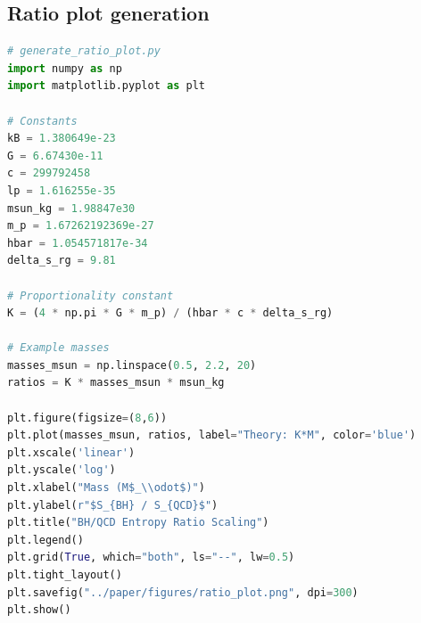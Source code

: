 \documentclass[aps,prd,onecolumn,nofootinbib,superscriptaddress]{revtex4-2}
\begin{document}
\subsection{Ratio plot generation}
\begin{lstlisting}[language=Python]
# generate_ratio_plot.py
import numpy as np
import matplotlib.pyplot as plt

# Constants
kB = 1.380649e-23
G = 6.67430e-11
c = 299792458
lp = 1.616255e-35
msun_kg = 1.98847e30
m_p = 1.67262192369e-27
hbar = 1.054571817e-34
delta_s_rg = 9.81

# Proportionality constant
K = (4 * np.pi * G * m_p) / (hbar * c * delta_s_rg)

# Example masses
masses_msun = np.linspace(0.5, 2.2, 20)
ratios = K * masses_msun * msun_kg

plt.figure(figsize=(8,6))
plt.plot(masses_msun, ratios, label="Theory: K*M", color='blue')
plt.xscale('linear')
plt.yscale('log')
plt.xlabel("Mass (M$_\\odot$)")
plt.ylabel(r"$S_{BH} / S_{QCD}$")
plt.title("BH/QCD Entropy Ratio Scaling")
plt.legend()
plt.grid(True, which="both", ls="--", lw=0.5)
plt.tight_layout()
plt.savefig("../paper/figures/ratio_plot.png", dpi=300)
plt.show()
\end{lstlisting}
\end{document}
